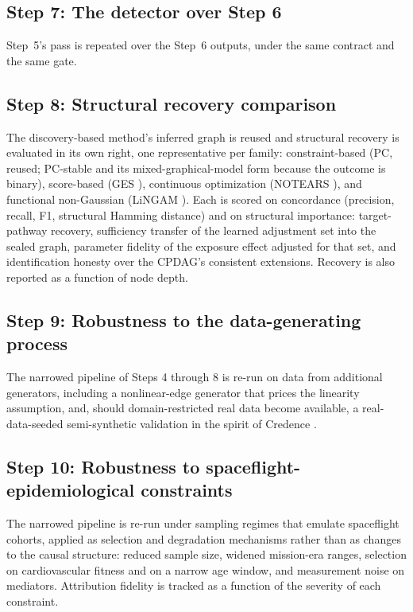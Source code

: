 \documentclass[11pt]{article}
\begin{document}
\subsection*{Step 7: The detector over Step 6}
Step~5's pass is repeated over the Step~6 outputs, under the same contract
and the same gate.

\subsection*{Step 8: Structural recovery comparison}
The discovery-based method's inferred graph is reused and structural
recovery is evaluated in its own right, one representative per family:
constraint-based (PC, reused; PC-stable \citep{ColomboMaathuis2014} and its
mixed-graphical-model form \citep{Sedgewick2019} because the outcome is
binary), score-based (GES \citep{Chickering2002}), continuous optimization
(NOTEARS \citep{Zheng2018}), and functional non-Gaussian (LiNGAM
\citep{Shimizu2006}). Each is scored on concordance (precision, recall, F1,
structural Hamming distance) and on structural importance: target-pathway
recovery, sufficiency transfer of the learned adjustment set into the sealed
graph, parameter fidelity of the exposure effect adjusted for that set, and
identification honesty over the CPDAG's consistent extensions. Recovery is
also reported as a function of node depth.

\subsection*{Step 9: Robustness to the data-generating process}
The narrowed pipeline of Steps 4 through 8 is re-run on data from
additional generators, including a nonlinear-edge generator that prices the
linearity assumption, and, should domain-restricted real data become
available, a real-data-seeded semi-synthetic validation in the spirit of
Credence \citep{Parikh2022}.

\subsection*{Step 10: Robustness to spaceflight-epidemiological constraints}
The narrowed pipeline is re-run under sampling regimes that emulate
spaceflight cohorts, applied as selection and degradation mechanisms rather
than as changes to the causal structure: reduced sample size, widened
mission-era ranges, selection on cardiovascular fitness and on a narrow age
window, and measurement noise on mediators. Attribution fidelity is tracked
as a function of the severity of each constraint.
\end{document}
